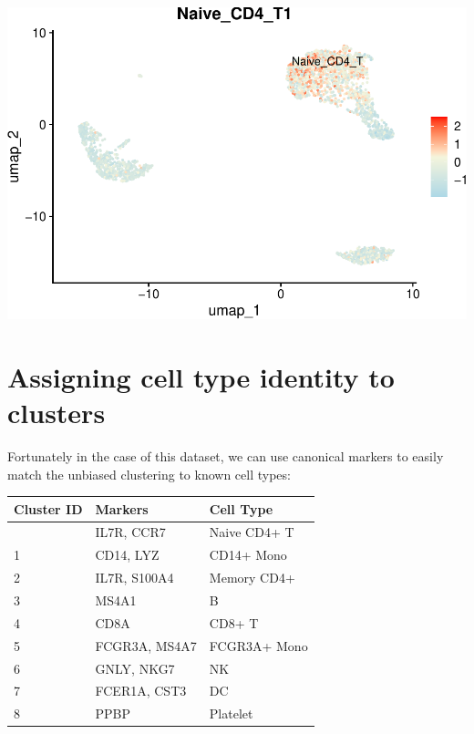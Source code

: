 \documentclass[
]{book}
\begin{document}
\includegraphics{scRNAseqInR_Doco_files/figure-latex/unnamed-chunk-32-1.pdf}

\section{Assigning cell type identity to clusters}\label{assigning-cell-type-identity-to-clusters}

Fortunately in the case of this dataset, we can use canonical markers to easily match the unbiased clustering to known cell types:

\begin{longtable}[]{@{}lll@{}}
\toprule\noalign{}
Cluster ID & Markers & Cell Type \\
\midrule\noalign{}
\endhead
\bottomrule\noalign{}
\endlastfoot
0 & IL7R, CCR7 & Naive CD4+ T \\
1 & CD14, LYZ & CD14+ Mono \\
2 & IL7R, S100A4 & Memory CD4+ \\
3 & MS4A1 & B \\
4 & CD8A & CD8+ T \\
5 & FCGR3A, MS4A7 & FCGR3A+ Mono \\
6 & GNLY, NKG7 & NK \\
7 & FCER1A, CST3 & DC \\
8 & PPBP & Platelet \\
\end{longtable}
\end{document}
